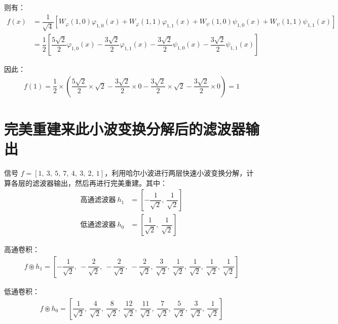 \documentclass{article}
\begin{document}
则有：
\begin{align*}
    f(x)&=\dfrac{1}{\displaystyle\sqrt{4}}\left[W_{\varphi}(1,0)\varphi_{1,0}(x)+W_{\varphi}(1,1)\varphi_{1,1}(x)+W_{\psi}(1,0)\psi_{1,0}(x)+W_{\psi}(1,1)\psi_{1,1}(x)\right]
    \\
    &=\dfrac{1}{2}\left[\dfrac{5\sqrt{2}}{2}\varphi_{1,0}(x)-\dfrac{3\sqrt{2}}{2}\varphi_{1,1}(x)-\dfrac{3\sqrt{2}}{2}\psi_{1,0}(x)-\dfrac{3\sqrt{2}}{2}\psi_{1,1}(x)\right]
\end{align*}

因此：
\begin{align*}
    f(1)=\dfrac{1}{2}\times\left(\dfrac{5\sqrt{2}}{2}\times\sqrt{2}-\dfrac{3\sqrt{2}}{2}\times0-\dfrac{3\sqrt{2}}{2}\times\sqrt{2}-\dfrac{3\sqrt{2}}{2}\times0\right)=1
\end{align*}



\section{完美重建来此小波变换分解后的滤波器输出}
信号 $f=[1,\ 3,\ 5,\ 7,\ 4,\ 3,\ 2,\ 1]$，利用哈尔小波进行两层快速小波变换分解，计算各层的滤波器输出，然后再进行完美重建。其中：
\begin{align*}
    \text{高通滤波器}\ h_1&=\left[-\dfrac{1}{\displaystyle\sqrt{2}},\ \dfrac{1}{\displaystyle\sqrt{2}}\right]
    \\
    \text{低通滤波器}\ h_0&=\left[\dfrac{1}{\displaystyle\sqrt{2}},\ \dfrac{1}{\displaystyle\sqrt{2}}\right]
\end{align*}

高通卷积：
\begin{align*}
    f\circledast h_1=\left[-\dfrac{1}{\displaystyle\sqrt{2}},\ -\dfrac{2}{\displaystyle\sqrt{2}},\ -\dfrac{2}{\displaystyle\sqrt{2}},\ -\dfrac{2}{\displaystyle\sqrt{2}},\ \dfrac{3}{\displaystyle\sqrt{2}},\ \dfrac{1}{\displaystyle\sqrt{2}},\ \dfrac{1}{\displaystyle\sqrt{2}},\ \dfrac{1}{\displaystyle\sqrt{2}},\ \dfrac{1}{\displaystyle\sqrt{2}}\right]
\end{align*}

低通卷积：
\begin{align*}
    f\circledast h_0=\left[\dfrac{1}{\displaystyle\sqrt{2}},\ \dfrac{4}{\displaystyle\sqrt{2}},\ \dfrac{8}{\displaystyle\sqrt{2}},\ \dfrac{12}{\displaystyle\sqrt{2}},\ \dfrac{11}{\displaystyle\sqrt{2}},\ \dfrac{7}{\displaystyle\sqrt{2}},\ \dfrac{5}{\displaystyle\sqrt{2}},\ \dfrac{3}{\displaystyle\sqrt{2}},\ \dfrac{1}{\displaystyle\sqrt{2}}\right]
\end{align*}
\end{document}
